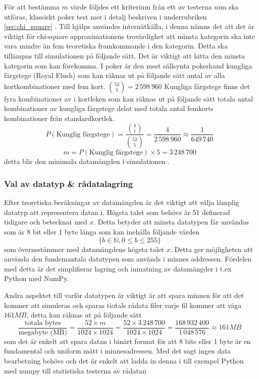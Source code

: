 \documentclass[swedish,a4paper]{article}
\begin{document}
För att bestämma $m$ värde följdes ett kriterium från ett av testerna som ska
utföras, klassiskt poker test mer i  detalj beskriven i underrubriken
\ref{sec:chi_square} . Till hjälps användes \parencite{nist} internätkälla, i
denna nämns det att det är viktigt för chi-square approximationens trovärdighet
att minsta kategorin ska inte vara mindre än fem teoretiska framkommande i den
kategorin. Detta ska tillämpas till simulationen på följande sätt. Det är
viktigt att hitta den minsta kategorin som kan förekomma. I poker är den mest
sällsynta pokerhand kungliga färgstege (Royal Flush) som kan räknas ut på
följande sätt antal av alla kortkombinationer med fem kort. $\binom{52}{5} =
2\,598\,960$ Kungliga färgstege finns det fyra  kombinationer av i kortleken
som kan räknas ut på följande sätt totala antal kombinationer av kungliga
färgstege delat med totala antal femkorts kombinationer från standardkortlek.
$$ P(\text{Kunglig färgstege}) =  \frac{\binom{4}{1}}{\binom{52}{5}} =
\frac{4}{2\,598\,960} \approx \frac{1}{649\,740} $$ $$m = P(\text{Kunglig
färgstege})  \times 5 = 3\,248\,700$$ detta blir den minimala datamängden i simulationen
.

\subsubsection{Val av datatyp \& rådatalagring} Efter teoretiska beräkningar av
datamängden är det viktigt att välja lämplig datatyp att representera datan i.
Högsta talet som behövs är 51 definerad tidigare och betecknat med $x$. Detta
betyder att minsta datatypen får användas som är 8 bit eller 1 byte långa som
kan inehålla följande värden $$\{b \in \mathbb{N},  0 \leq b \leq 255 \}$$ som
överns\-stämmer med datamängdens högsta talet $x$. Detta ger möjligheten att
använda den fundemantala datatypen som används i minnes addressen. Fördelen med
detta är det simplifierar lagring och inmatning av datamängder i t.ex Python
med NumPy.

Andra aspektet till varför datatypen är viktigt är att spara minnen för att det
kommer att simuleras och sparas tiotals rådata filer varje fil kommer att väga
$161 MB$,
detta kan räknas ut på följande sätt
$$ \frac{\text{totala bytes}}{\text{megabyte (MB)}} = \frac{52 \times m }{1024 \times
1024} = \frac{52 \times 3\,248\,700}{1024 \times 1024} = \frac{168\,932\,400}{1\,048\,576} \approx 161 MB 
$$
som det är enkelt att spara datan i binärt format för att 8 bits eller 1 byte
är en fundamental och uniform mått i minnesadressen. Med det sagt ingen data
bearbetning behövs och det är enkelt att ladda in denna i till exempel Python
med numpy till statistiska testerna av rådatan
\end{document}
